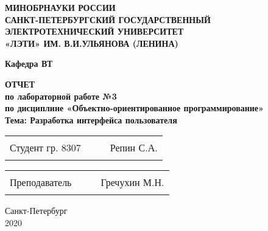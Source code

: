 \begin{titlepage}
\begin{center}
    \uppercase{\textbf{Минобрнауки России\\
            Санкт-Петербургский государственный\\
            электротехнический университет\\
            «ЛЭТИ» им. В.И.Ульянова (Ленина)
    }}
    \vspace{0.25cm}

    \textbf{Кафедра ВТ}
    \vfill

    \uppercase{\textbf{\large{
        Отчет
    }}}
    \\
    \textbf{\large{
      по лабораторной работе №3\\
      по дисциплине «Объектно-ориентированное программирование»\\
      Тема: Разработка интерфейса пользователя\\
      \vspace{0.5cm}
    }}
  \bigskip
\end{center}
\vfill

\begin{tabularx}{\textwidth}{@{}lcXr}
    Студент гр. 8307 & \hspace{1.6cm} & \rule{5cm}{1pt} & Репин С.А.
\end{tabularx}

\vspace{0.5cm}

\noindent
\begin{tabularx}{\textwidth}{@{}lcXr}
    Преподаватель & \hspace{2cm} & \rule{5cm}{1pt} & Гречухин М.Н.
\end{tabularx}

\hfill \break
\hfill \break

\begin{center}
  Санкт-Петербург\\2020
\end{center}

\end{titlepage}

